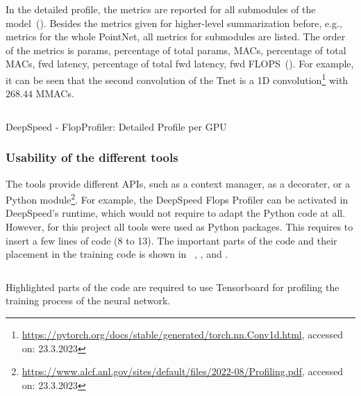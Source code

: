 \documentclass[12pt, a4paper, hidelinks]{article}
\begin{document}
In the detailed profile, the metrics are reported for all submodules of the model~(). Besides the metrics given for higher-level summarization before, e.g., metrics for the whole PointNet, all metrics for submodules are listed. The order of the metrics is params, percentage of total params, MACs, percentage of total MACs, fwd latency, percentage of total fwd latency, fwd FLOPS~(). For example, it can be seen that the second convolution of the Tnet is a 1D convolution\footnote{\url{https://pytorch.org/docs/stable/generated/torch.nn.Conv1d.html}, accessed on: 23.3.2023} with $268.44$ MMACs.

\begin{listing}[H]
\inputminted[xleftmargin=1em,linenos,fontsize=\small, firstline=41,lastline=48, breaklines]{python}{./assets/scap_gtx1080_deepspeed_14615344_4294967294_one-epoch.txt}
\caption{DeepSpeed - FlopProfiler: Detailed Profile per GPU}
\label{lst:scap_gtx1080_deepspeed_14615344_4294967294_one-epoch-detailed}
\end{listing}

\subsubsection{Usability of the different tools}
\label{sec:r-usability}

The tools provide different \ac{API}s, such as a context manager, as a decorater, or a Python module\footnote{\url{https://www.alcf.anl.gov/sites/default/files/2022-08/Profiling.pdf}, accessed on: 23.3.2023}. For example, the DeepSpeed Flops Profiler can be activated in DeepSpeed's runtime, which would not require to adapt the Python code at all. However, for this project all tools were used as Python packages. This requires to insert a few lines of code (8 to 13). The important parts of the code and their placement in the training code is shown in ~, , and .

\begin{listing}[H]
\inputminted[xleftmargin=1em,linenos,fontsize=\small, highlightlines={1,3,9-12,14-16}]{python}{./assets/tensorboard.py}
\caption[Code example for Tensorboard]{Highlighted parts of the code are required to use Tensorboard for profiling the training process of the neural network.}
\label{lst:tensorboard}
\end{listing}
\end{document}
